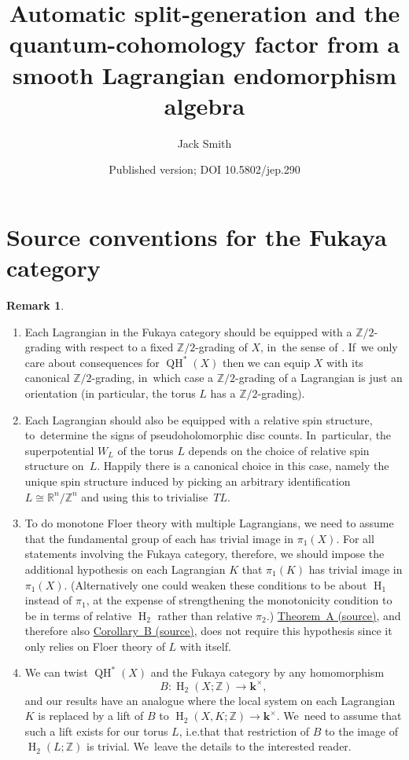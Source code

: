 \documentclass[10pt]{amsart}
\title[Generation from smoothness]{Automatic split-generation and the quantum-cohomology factor from a smooth Lagrangian endomorphism algebra}
\author{Jack Smith}
\date{Published version; DOI 10.5802/jep.290}
\newcommand{\ie}{i.e.}
\theoremstyle{definition}
\newtheorem{remark}[theorem]{Remark}
\newcommand{\RR}{\mathbb{R}}
\newcommand{\ZZ}{\mathbb{Z}}
\newcommand{\kk}{{\boldsymbol{k}}}
\newcommand{\rH}{\operatorname{H}}
\newcommand{\QH}{\operatorname{QH}}
\let\sourceLocalCref\cref
\renewcommand{\cref}[1]{\ifstrequal{#1}{TheoremA}{\href{https://doi.org/10.5802/jep.290}{Theorem~A (source)}}{\ifstrequal{#1}{CorollaryB}{\href{https://doi.org/10.5802/jep.290}{Corollary~B (source)}}{\sourceLocalCref{#1}}}}
\begin{document}
\maketitle
\section*{Source conventions for the Fukaya category}
\setcounter{section}{1}\setcounter{theorem}{7}
\begin{remark}
\label{rmkFukTechnical}
\begin{enumerate}
\item Each Lagrangian in the Fukaya category should be equipped with a $\ZZ/2$-grading with respect to a fixed $\ZZ/2$-grading of $X$, in~the sense of \cite{SeidelGraded}. If~we only care about consequences for $\QH^*(X)$ then we can equip $X$ with its canonical $\ZZ/2$-grading, in~which case a $\ZZ/2$-grading of a Lagrangian is just an orientation (in particular, the torus $L$ has a $\ZZ/2$-grading).
\item Each Lagrangian should also be equipped with a relative spin structure, to~determine the signs of pseudoholomorphic disc counts. In~particular, the superpotential $W_L$ of the torus $L$ depends on the choice of relative spin structure on~$L$. Happily there is a canonical choice in this case, namely the unique spin structure induced by picking an arbitrary identification $L \!\cong\! \RR^n / \ZZ^n$ and using this to trivialise~$TL$.
\item To do monotone Floer theory with multiple Lagrangians, we need to assume that the fundamental group of each has trivial image in $\pi_1(X)$. For all statements involving the Fukaya category, therefore, we should impose the additional hypothesis on each Lagrangian $K$ that $\pi_1(K)$ has trivial image in $\pi_1(X)$. (Alternatively one could weaken these conditions to be about $\rH_1$ instead of $\pi_1$, at the expense of strengthening the monotonicity condition to be in terms of relative $\rH_2$ rather than relative $\pi_2$.) \cref{TheoremA}, and therefore also \cref{CorollaryB}, does not require this hypothesis since it only relies on Floer theory of $L$ with itself.
\item We can twist $\QH^*(X)$ and the Fukaya category by any homomorphism
\[
B : \rH_2(X; \ZZ) \to \kk^\times,
\]
and our results have an analogue where the local system on each Lagrangian $K$ is replaced by a lift of $B$ to $\rH_2(X, K; \ZZ) \to \kk^\times$. We~need to assume that such a lift exists for our torus $L$, \ie that that restriction of $B$ to the image of $\rH_2(L; \ZZ)$ is trivial. We~leave the details to the interested reader.
\end{enumerate}
\end{remark}
\setcounter{section}{1}\setcounter{equation}{1}
\end{document}
